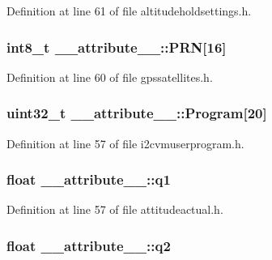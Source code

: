\-Definition at line 61 of file altitudeholdsettings.\-h.

\hypertarget{struct____attribute_____a8f93fcaaf736f28d0aa0b666d598af02}{
\subsubsection[{\-P\-R\-N}]{\setlength{\rightskip}{0pt plus 5cm}int8\-\_\-t {\bf \-\_\-\-\_\-attribute\-\_\-\-\_\-\-::\-P\-R\-N}\mbox{[}16\mbox{]}}}\label{struct____attribute_____a8f93fcaaf736f28d0aa0b666d598af02}


\-Definition at line 60 of file gpssatellites.\-h.

\hypertarget{struct____attribute_____a622366a301b3ba106b61751866de421b}{
\subsubsection[{\-Program}]{\setlength{\rightskip}{0pt plus 5cm}uint32\-\_\-t {\bf \-\_\-\-\_\-attribute\-\_\-\-\_\-\-::\-Program}\mbox{[}20\mbox{]}}}\label{struct____attribute_____a622366a301b3ba106b61751866de421b}


\-Definition at line 57 of file i2cvmuserprogram.\-h.

\hypertarget{struct____attribute_____a3f0abcad63e3cc8003125c44dfe4f8ec}{
\subsubsection[{q1}]{\setlength{\rightskip}{0pt plus 5cm}float {\bf \-\_\-\-\_\-attribute\-\_\-\-\_\-\-::q1}}}\label{struct____attribute_____a3f0abcad63e3cc8003125c44dfe4f8ec}


\-Definition at line 57 of file attitudeactual.\-h.

\hypertarget{struct____attribute_____a87cc07dcd069aa702766f473dcfb1503}{
\subsubsection[{q2}]{\setlength{\rightskip}{0pt plus 5cm}float {\bf \-\_\-\-\_\-attribute\-\_\-\-\_\-\-::q2}}}\label{struct____attribute_____a87cc07dcd069aa702766f473dcfb1503}



